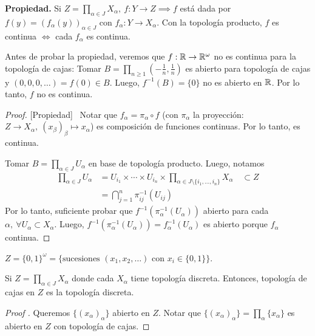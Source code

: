 \documentclass[a4paper]{report}
\begin{document}
\noindent \textbf{Propiedad.} Si $Z = \prod_{\alpha \in J} X_{\alpha},\ f: Y \to Z \implies f$ está dada por $f(y) = (f_{\alpha}(y))_{\alpha \in J}$ con $f_{\alpha}: Y \to X_{\alpha}$. Con la topología producto, $f$ es continua $\iff$ cada $f_{\alpha}$ es continua. \newline

\noindent Antes de probar la propiedad, veremos que $f:\mathbb{R} \to \mathbb{R}^{\omega}$ no es continua para la topología de cajas: Tomar $B = \prod_{n\geq 1} \left( -\frac{1}{n}, \frac{1}{n}\right)$ es abierto para topología de cajas y $(0,0,0,\dots) = f(0) \in B$. Luego, $f^{-1}(B) = \{0\}$ no es abierto en $\mathbb{R}$. Por lo tanto, $f$ no es continua. \newline

\begin{proof}[Proof][Propiedad]~
	\Onlyifstep Notar que $f_{\alpha} = \pi_{\alpha} \circ f$ (con $\pi_{\alpha}$ la proyección: $Z\to X_{\alpha},\ (x_{\beta})_{\beta} \mapsto x_{\alpha}$) es composición de funciones continuas. Por lo tanto, es continua.\newline

	\noindent \Ifstep Tomar $B = \prod_{\alpha \in J} U_{\alpha}$ en base de topología producto. Luego, notamos
	\begin{align*}
		\prod_{\alpha \in J} U_{\alpha} & = U_{i_1} \times \cdots \times U_{i_n} \times \prod_{\alpha \in J \setminus \{i_1,\dots,i_n\}  } X_{\alpha} \quad \subset Z \\
		& = \bigcap_{j=1}^{n} \pi_{ij}^{-1} (U_{ij})
	\end{align*}
	Por lo tanto, suficiente probar que $f^{-1}(\pi_{\alpha}^{-1}(U_{\alpha}))$ abierto para cada $\alpha,\ \forall U_{\alpha} \subset X_{\alpha}$. Luego, $f^{-1}(\pi_{\alpha}^{-1}(U_{\alpha})) = f_{\alpha}^{-1}(U_{\alpha})$ es abierto porque $f_{\alpha}$ continua.
\end{proof}

\begin{eg}
	$Z = \{0,1\}^{\omega} = \{ \text{sucesiones } (x_1,x_2,\dots) \text{ con } x_i \in \{0,1\}  \}$.    
\end{eg}

\begin{lemma}
	Si $Z = \prod_{\alpha \in J} X_{\alpha}$ donde cada $X_{\alpha}$ tiene topología discreta. Entonces, topología de cajas en $Z$ es la topología discreta.
\end{lemma}

\begin{proof}[Proof ]
	Queremos $\{(x_{\alpha})_{\alpha}\}$ abierto en $Z$. Notar que $\{(x_{\alpha})_{\alpha}\} = \prod_{\alpha} \{x_{\alpha}\}$ es abierto en $Z$ con topología de cajas.   
\end{proof}
\end{document}
